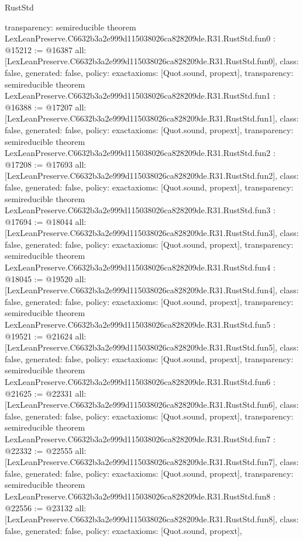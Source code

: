 \begin{lexlean}{RustStd}
\begin{coremodule}
{  transparency: semireducible
}
theorem LexLeanPreserve.C6632b3a2e999d115038026ca828209de.R31.RustStd.fun0 : @15212 := @16387 {
  all: [LexLeanPreserve.C6632b3a2e999d115038026ca828209de.R31.RustStd.fun0],
  class: false,
  generated: false,
  policy: exact{axioms: [Quot.sound, propext]},
  transparency: semireducible
}
theorem LexLeanPreserve.C6632b3a2e999d115038026ca828209de.R31.RustStd.fun1 : @16388 := @17207 {
  all: [LexLeanPreserve.C6632b3a2e999d115038026ca828209de.R31.RustStd.fun1],
  class: false,
  generated: false,
  policy: exact{axioms: [Quot.sound, propext]},
  transparency: semireducible
}
theorem LexLeanPreserve.C6632b3a2e999d115038026ca828209de.R31.RustStd.fun2 : @17208 := @17693 {
  all: [LexLeanPreserve.C6632b3a2e999d115038026ca828209de.R31.RustStd.fun2],
  class: false,
  generated: false,
  policy: exact{axioms: [Quot.sound, propext]},
  transparency: semireducible
}
theorem LexLeanPreserve.C6632b3a2e999d115038026ca828209de.R31.RustStd.fun3 : @17694 := @18044 {
  all: [LexLeanPreserve.C6632b3a2e999d115038026ca828209de.R31.RustStd.fun3],
  class: false,
  generated: false,
  policy: exact{axioms: [Quot.sound, propext]},
  transparency: semireducible
}
theorem LexLeanPreserve.C6632b3a2e999d115038026ca828209de.R31.RustStd.fun4 : @18045 := @19520 {
  all: [LexLeanPreserve.C6632b3a2e999d115038026ca828209de.R31.RustStd.fun4],
  class: false,
  generated: false,
  policy: exact{axioms: [Quot.sound, propext]},
  transparency: semireducible
}
theorem LexLeanPreserve.C6632b3a2e999d115038026ca828209de.R31.RustStd.fun5 : @19521 := @21624 {
  all: [LexLeanPreserve.C6632b3a2e999d115038026ca828209de.R31.RustStd.fun5],
  class: false,
  generated: false,
  policy: exact{axioms: [Quot.sound, propext]},
  transparency: semireducible
}
theorem LexLeanPreserve.C6632b3a2e999d115038026ca828209de.R31.RustStd.fun6 : @21625 := @22331 {
  all: [LexLeanPreserve.C6632b3a2e999d115038026ca828209de.R31.RustStd.fun6],
  class: false,
  generated: false,
  policy: exact{axioms: [Quot.sound, propext]},
  transparency: semireducible
}
theorem LexLeanPreserve.C6632b3a2e999d115038026ca828209de.R31.RustStd.fun7 : @22332 := @22555 {
  all: [LexLeanPreserve.C6632b3a2e999d115038026ca828209de.R31.RustStd.fun7],
  class: false,
  generated: false,
  policy: exact{axioms: [Quot.sound, propext]},
  transparency: semireducible
}
theorem LexLeanPreserve.C6632b3a2e999d115038026ca828209de.R31.RustStd.fun8 : @22556 := @23132 {
  all: [LexLeanPreserve.C6632b3a2e999d115038026ca828209de.R31.RustStd.fun8],
  class: false,
  generated: false,
  policy: exact{axioms: [Quot.sound, propext]},
}
\end{coremodule}
\end{lexlean}
